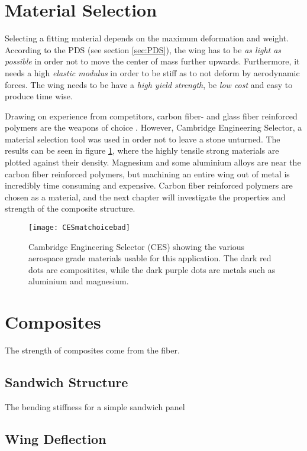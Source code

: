 \section{Material Selection}

  Selecting a fitting material depends on the maximum deformation and weight. According to the PDS (see section \ref{sec:PDS}), the wing has to be \emph{as light as possible} in order not to move the center of mass further upwards. Furthermore, it needs a high \emph{elastic modulus} in order to be stiff as to not deform by aerodynamic forces. The wing needs to be have a \emph{high yield strength}, be \emph{low cost} and easy to produce time wise.

  Drawing on experience from competitors, carbon fiber- and glass fiber reinforced polymers are the weapons of choice \cite{FSwingmaterial}. However, Cambridge Engineering Selector, a material selection tool was used in order not to leave a stone unturned. The results can be seen in figure \ref{fig:CESmatchoice}, where the highly tensile strong materials are plotted against their density. Magnesium and some aluminium alloys are near the carbon fiber reinforced polymers, but machining an entire wing out of metal is incredibly time consuming and expensive. Carbon fiber reinforced polymers are chosen as a material, and the next chapter will investigate the properties and strength of the composite structure.

  \begin{figure}
    \texttt{[image: CESmatchoicebad]}
    \caption{Cambridge Engineering Selector (CES) showing the various aerospace grade materials usable for this application. The dark red dots are compositites, while the dark purple dots are metals such as aluminium and magnesium.}
    \label{fig:CESmatchoice}
  \end{figure}

\section{Composites}

  The strength of composites come from the fiber.

  \subsection{Sandwich Structure}

    The bending stiffness for a simple sandwich panel

  \subsection{Wing Deflection}


